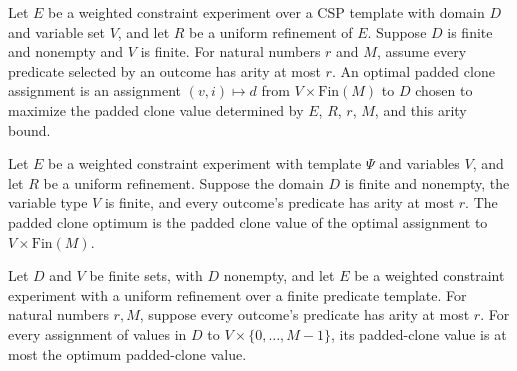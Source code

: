 \begin{definition}
\label{FABL.WeightedConstraintExperiment.UniformRefinement.paddedCloneOptimalAssignment}
\leanok
{}
Let $E$ be a weighted constraint experiment over a CSP template with domain $D$ and
variable set $V$, and let $R$ be a uniform refinement of $E$. Suppose $D$ is finite and
nonempty and $V$ is finite. For natural numbers $r$ and $M$, assume every predicate
selected by an outcome has arity at most $r$. An optimal padded clone assignment is an
assignment $(v,i)\mapsto d$ from $V\times\mathrm{Fin}(M)$ to $D$ chosen to maximize
the padded clone value determined by $E$, $R$, $r$, $M$, and this arity bound.
\end{definition}

\begin{definition}
\label{FABL.WeightedConstraintExperiment.UniformRefinement.paddedCloneOptimum}
\leanok
{}
Let $E$ be a weighted constraint experiment with template $\Psi$ and variables $V$, and
let $R$ be a uniform refinement. Suppose the domain $D$ is finite and nonempty, the
variable type $V$ is finite, and every outcome's predicate has arity at most $r$. The
padded clone optimum is the padded clone value of the optimal assignment to
$V\times\mathrm{Fin}(M)$.
\end{definition}

\begin{theorem}
\label{FABL.WeightedConstraintExperiment.UniformRefinement.paddedCloneValue_le_optimum}
\leanok
{}
Let $D$ and $V$ be finite sets, with $D$ nonempty, and let $E$ be a weighted constraint
experiment with a uniform refinement over a finite predicate template. For natural
numbers $r,M$, suppose every outcome's predicate has arity at most $r$. For every
assignment of values in $D$ to $V\times\{0,\ldots,M-1\}$, its padded-clone value is at
most the optimum padded-clone value.
\end{theorem}


